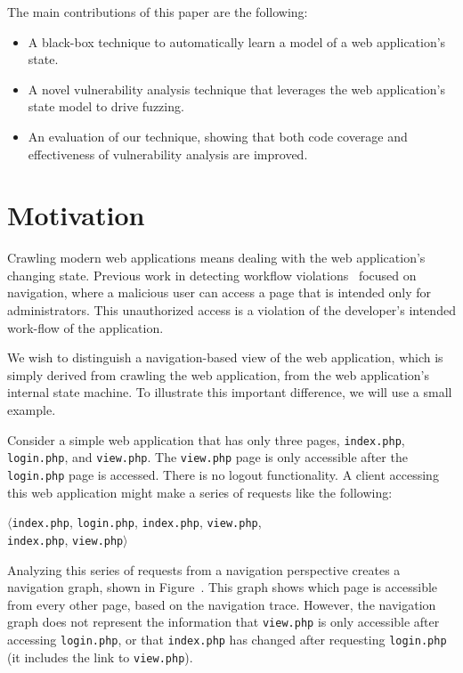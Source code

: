 \noindent{}The main contributions of this paper are the following:
\begin{itemize}
 \item A black-box technique to automatically learn a model of a web
   application's state. 
 \item A novel vulnerability analysis technique that leverages the web
   application's state model to drive fuzzing.
 \item An evaluation of our technique, showing that both code coverage and
   effectiveness of vulnerability analysis are improved.
\end{itemize}

\section{Motivation}



Crawling modern web applications means dealing with the web application's
changing state. Previous work in detecting workflow
violations~\cite{balzarotti07:mimosa,li11:BLOCK,cova07:swaddler,felmetsger10:logic}
focused on navigation, where a malicious user can access a page that is
intended only for administrators. This unauthorized access is a violation of
the developer's intended work-flow of the application.

We wish to distinguish a navigation-based view of the web application, which is
simply derived from crawling the web application, from the web application's
internal state machine. To illustrate this important difference, we will use a small
example.

Consider a simple web application that has only three pages,
\texttt{index.php}, \texttt{login.php}, and \texttt{view.php}. The
\texttt{view.php} page is only accessible after the \texttt{login.php} page is
accessed. There is no logout functionality. A client accessing this web
application might make a series of requests like the following:

\noindent{}$\langle$\texttt{index.php}, \texttt{login.php}, \texttt{index.php},
\texttt{view.php}, \\
\phantom{$\langle$}\texttt{index.php}, \texttt{view.php}$\rangle$

Analyzing this series of requests from a navigation perspective creates a
navigation graph, shown in Figure~. This graph shows
which page is accessible from every other page, based on the navigation trace.
However, the navigation graph does not represent the information that
\texttt{view.php} is only accessible after accessing \texttt{login.php}, or
that \texttt{index.php} has changed after requesting \texttt{login.php} (it
includes the link to \texttt{view.php}).

